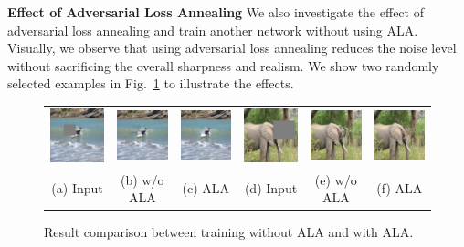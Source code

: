 \noindent\textbf{Effect of Adversarial Loss Annealing} We also investigate the effect of adversarial loss annealing and train another network without using ALA. Visually, we observe that using adversarial loss annealing reduces the noise level without sacrificing the overall sharpness and realism. We show two randomly selected examples in Fig.~\ref{fig:ala} to illustrate the effects. 

\begin{figure}[h!]
\centering
\small
\begin{tabular}{cccccc}
\includegraphics[width=.16\textwidth]{figures/ALA/000000063154_input_image.jpg}&
\includegraphics[width=.16\textwidth]{figures/ALA/000000063154_synthesized_image.jpg}&
\includegraphics[width=.16\textwidth]{figures/ALA/000000063154_synthesized_image-1.jpg}&
\includegraphics[width=.16\textwidth]{figures/ALA/000000475779_input_image.jpg}&
\includegraphics[width=.16\textwidth]{figures/ALA/000000475779_synthesized_image.jpg}&
\includegraphics[width=.16\textwidth]{figures/ALA/000000475779_synthesized_image-1.jpg}\\
(a) Input & (b) w/o ALA & (c) ALA & (d) Input & (e) w/o ALA & (f) ALA \\
\end{tabular}
\caption{Result comparison between training without ALA and with ALA.}
\label{fig:ala}
\vspace{-15pt}
\end{figure}  

